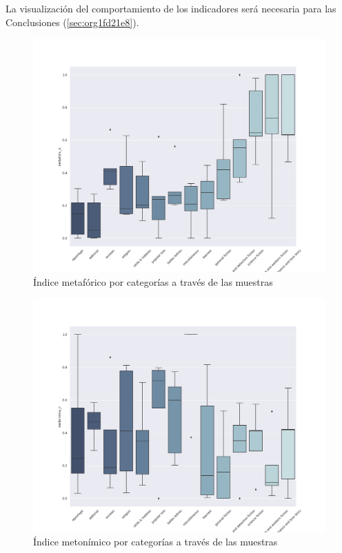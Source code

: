 \documentclass[12pt,letterpaper,twoside]{article}
\begin{document}
La visualización del comportamiento de los indicadores será necesaria para las Conclusiones (\ref{sec:org1fd21e8}).

\begin{figure}[H]
\centering
\includegraphics[width=0.9\linewidth]{./resultados/graphs/total/accum_cat_metafora.png}
\caption{\label{fig:metafora_categorias} Índice metafórico por categorías a través de las muestras }
\end{figure}
\begin{figure}[H]
\centering
\includegraphics[width=0.9\linewidth]{./resultados/graphs/total/accum_cat_metonimia.png}
\caption{\label{fig:metonimia_categorias} Índice metonímico por categorías a través de las muestras  }
\end{figure}
\end{document}
